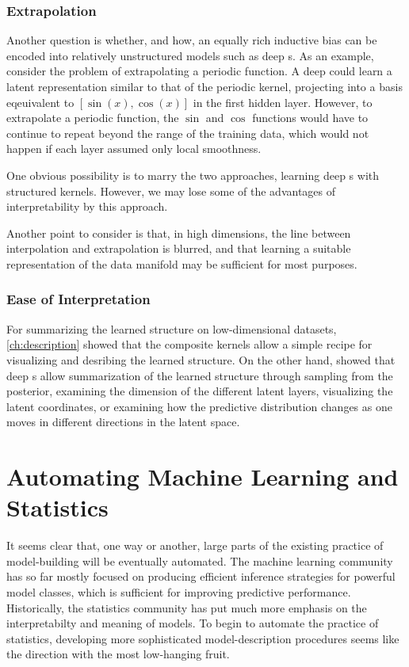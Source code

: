 \subsubsection{Extrapolation}
Another question is whether, and how, an equally rich inductive bias can be encoded into relatively unstructured models such as deep \gp{}s.
As an example, consider the problem of extrapolating a periodic function.
A deep \gp{} could learn a latent representation similar to that of the periodic kernel, projecting into a basis eqeuivalent to $[\sin(x), \cos(x)]$ in the first hidden layer.
However, to extrapolate a periodic function, the $\sin$ and $\cos$ functions would have to continue to repeat beyond the range of the training data, which would not happen if each layer assumed only local smoothness.

One obvious possibility is to marry the two approaches, learning deep \gp{}s with structured kernels.
However, we may lose some of the advantages of interpretability by this approach.

Another point to consider is that, in high dimensions, the line between interpolation and extrapolation is blurred, and that learning a suitable representation of the data manifold may be sufficient for most purposes.

\subsubsection{Ease of Interpretation}
For summarizing the learned structure on low-dimensional datasets, \cref{ch:description} showed that the composite kernels allow a simple recipe for visualizing and desribing the learned structure.
On the other hand, \citet{damianou2012deep} showed that deep \gplvm{}s allow summarization of the learned structure through sampling from the posterior, examining the dimension of the different latent layers, visualizing the latent coordinates, or examining how the predictive distribution changes as one moves in different directions in the latent space.

\section{Automating Machine Learning and Statistics}

It seems clear that, one way or another, large parts of the existing practice of model-building will be eventually automated.
The machine learning community has so far mostly focused on producing efficient inference strategies for powerful model classes, which is sufficient for improving predictive performance.
Historically, the statistics community has put much more emphasis on the interpretabilty and meaning of models.
To begin to automate the practice of statistics, developing more sophisticated model-description procedures seems like the direction with the most low-hanging fruit.




